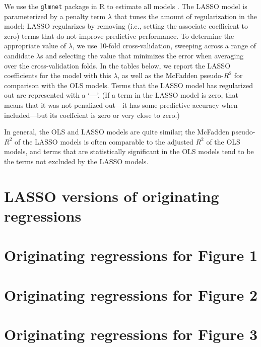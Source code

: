 \documentclass[10pt,landscape]{article}
\begin{document}
We use the \texttt{glmnet} package in R to estimate all models \parencite{simon_regularization_2011}. 
The LASSO model is parameterized by a penalty term \(\lambda\) that tunes the amount of regularization in the model; LASSO regularizes by removing (i.e., setting the associate coefficient to zero) terms that do not improve predictive performance.
To determine the appropriate value of \(\lambda\), we use 10-fold cross-validation, sweeping across a range of candidate \(\lambda\)s and selecting the value that minimizes the error when averaging over the cross-validation folds.
In the tables below, we report the LASSO coefficients for the model with this \(\lambda\), as well as the McFadden pseudo-\(R^2\) for comparison with the OLS models.
Terms that the LASSO model has regularized out are represented with a `---'. 
(If a term in the LASSO model is zero, that means that it was not penalized out---it has some predictive accuracy when included---but its coeffcient is zero or very close to zero.)

In general, the OLS and LASSO models are quite similar; the McFadden pseudo-\(R^2\) of the LASSO models is often comparable to the adjusted \(R^2\) of the OLS models, and terms that are statistically significant in the OLS models tend to be the terms not excluded by the LASSO models. 
\clearpage

\section{LASSO versions of originating regressions}
\section{Originating regressions for Figure 1}

\clearpage

\section{Originating regressions for Figure 2}

\clearpage

\section{Originating regressions for Figure 3}

\clearpage

\clearpage

\clearpage

\clearpage
\end{document}
